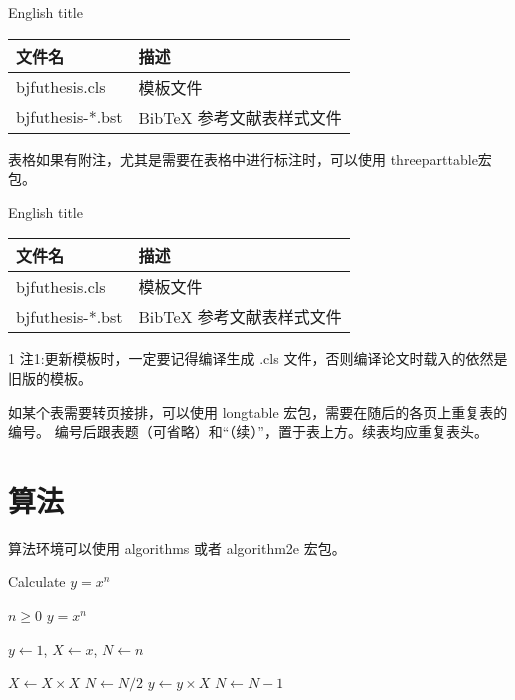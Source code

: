 \begin{table}[h]
\xiaowu

  \centering
   {English title}
  \begin{tabular}{ll}
    \toprule
    文件名          & 描述                         \\
    \midrule
    bjfuthesis.cls   & 模板文件                    \\
    bjfuthesis-*.bst & BibTeX 参考文献表样式文件    \\
    \bottomrule
  \end{tabular}
  \label{tab:three-line}
\end{table}

表格如果有附注，尤其是需要在表格中进行标注时，可以使用 threeparttable宏包。

\begin{table}[h]
\xiaowu
  \centering
  \begin{threeparttable}[c]
     {English title}
    \label{tab:three-part-table}
    \begin{tabular}{ll}
      \toprule
      文件名                 & 描述                         \\
      \midrule
      bjfuthesis.cls\tnote{1} & 模板文件                     \\
      bjfuthesis-*.bst        & BibTeX 参考文献表样式文件    \\
      \bottomrule
    \end{tabular}
    \begin{tablenotes}

      \item [1] 注1:更新模板时，一定要记得编译生成 .cls 文件，否则编译论文时载入的依然是旧版的模板。
    \end{tablenotes}
  \end{threeparttable}
\end{table}

如某个表需要转页接排，可以使用 longtable 宏包，需要在随后的各页上重复表的编号。
编号后跟表题（可省略）和“（续）”，置于表上方。续表均应重复表头。


\section{算法}

算法环境可以使用 algorithms 或者 algorithm2e 宏包。
\renewcommand{\algorithmicrequire}{\textbf{输入：}\unskip}
\renewcommand{\algorithmicensure}{\textbf{输出：}\unskip}

\begin{algorithm}[ht]
  \caption{Calculate $y = x^n$} 
  \label{alg1}
  \small
  \begin{algorithmic}
    \REQUIRE $n \geq 0$
    \ENSURE $y = x^n$

    \STATE $y \leftarrow 1$, $X \leftarrow x$, $N \leftarrow n$

        \STATE $X \leftarrow X \times X$
        \STATE $N \leftarrow N / 2$
      \ELSE[$N$ is odd]
        \STATE $y \leftarrow y \times X$
        \STATE $N \leftarrow N - 1$
      \ENDIF
    \ENDWHILE
  \end{algorithmic}
\end{algorithm}
